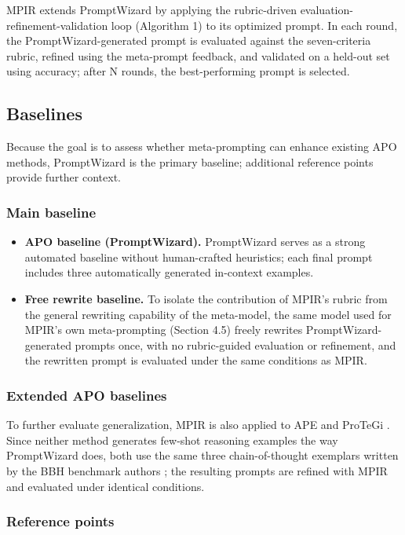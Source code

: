 \documentclass[a4paper,fleqn]{cas-sc}
\begin{document}
MPIR extends PromptWizard by applying the rubric-driven evaluation-refinement-validation loop (Algorithm 1) to its optimized prompt. In each round, the PromptWizard-generated prompt is evaluated against the seven-criteria rubric, refined using the meta-prompt feedback, and validated on a held-out set using accuracy; after N rounds, the best-performing prompt is selected.

\subsection{Baselines}

Because the goal is to assess whether meta-prompting can enhance existing APO methods, PromptWizard is the primary baseline; additional reference points provide further context.

\subsubsection{Main baseline}

\begin{itemize}
\item \textbf{APO baseline (PromptWizard).} PromptWizard serves as a strong automated baseline without human-crafted heuristics; each final prompt includes three automatically generated in-context examples.
\item \textbf{Free rewrite baseline.} To isolate the contribution of MPIR's rubric from the general rewriting capability of the meta-model, the same model used for MPIR's own meta-prompting (Section 4.5) freely rewrites PromptWizard-generated prompts once, with no rubric-guided evaluation or refinement, and the rewritten prompt is evaluated under the same conditions as MPIR.
\end{itemize}

\subsubsection{Extended APO baselines}

To further evaluate generalization, MPIR is also applied to APE \citep{zhou2023} and ProTeGi \citep{pryzant2023}. Since neither method generates few-shot reasoning examples the way PromptWizard does, both use the same three chain-of-thought exemplars written by the BBH benchmark authors \citep{suzgun2023}; the resulting prompts are refined with MPIR and evaluated under identical conditions.

\subsubsection{Reference points}
\end{document}
